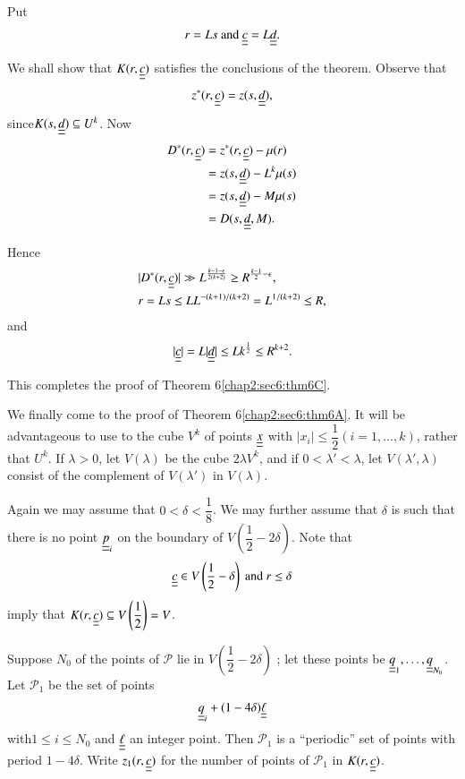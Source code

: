 Put
$$
r = Ls \text{ and } \underline{\underline{c}} = L \underline{\underline{d}}.
$$

We shall show that $K(r, \underline{\underline{c}})$ satisfies the conclusions of the theorem. Observe that
$$
z^{*} (r, \underline{\underline{c}}) = z(s, \underline{\underline{d}}),
$$
since\pageoriginale $K(s, \underline{\underline{d}}) \subseteq U^{k}$. Now
\begin{align*}
D^{*} (r, \underline{\underline{c}}) & = z^{*} (r, \underline{\underline{c}}) - \mu(r)\\
& = z(s, \underline{\underline{d}}) - L^{k} \mu(s)\\
& = z(s, \underline{\underline{d}}) - M\mu(s)\\
& = D(s, \underline{\underline{d}}, M).
\end{align*}

Hence
\begin{align*}
& |D^{*} (r, \underline{\underline{c}})| \gg L^{\frac{k-1-\epsilon}{2(k+2)}} \geq R^{\frac{k-1}{2} - \epsilon},\\
& r = Ls \leq L L^{-(k+1)/(k+2)} = L^{1/(k+2)} \leq R,
\end{align*}
and
\begin{equation*}
|\underline{\underline{c}}| = L|\underline{\underline{d}}| \leq L k^{\frac{1}{2}} \leq R^{k+2}.
\end{equation*}

This completes the proof of Theorem 6\ref{chap2:sec6:thm6C}.

We finally come to the proof of Theorem 6\ref{chap2:sec6:thm6A}. It will be advantageous to use to the cube $V^{k}$ of points $\underline{\underline{x}}$ with $|x_{i}| \leq \dfrac{1}{2} (i = 1, \ldots, k)$, rather that $U^{k}$. If $\lambda > 0$, let $V(\lambda)$ be the cube $2\lambda V^{k}$, and if $0 < \lambda' < \lambda$, let $V(\lambda', \lambda)$ consist of the complement of $V(\lambda')$ in $V(\lambda)$.

Again we may assume that $0 < \delta < \dfrac{1}{8}$. We may further assume that $\delta$ is such that there is no point $\underline{\underline{p}}_{i}$ on the boundary of $V\left(\dfrac{1}{2} - 2\delta\right)$. Note that
$$
\underline{\underline{c}} \in V \left(\frac{1}{2} - \delta\right) \text{ and } r \leq \delta
$$
imply that $K(r, \underline{\underline{c}}) \subseteq V \left(\dfrac{1}{2}\right) = V$.

Suppose $N_{0}$ of the points of $\mathscr{P}$ lie in $V \left(\dfrac{1}{2} - 2\delta\right)$ ; let these points be $\underline{\underline{q}}_{1}, \ldots, \underline{\underline{q}}_{N_{0}}$. Let $\mathscr{P}_{1}$ be the set of points
$$
\underline{\underline{q}}_{i} + (1-4\delta)\underline{\underline{\ell}}
$$
with\pageoriginale $1 \leq i \leq N_{0}$ and $\underline{\underline{\ell}}$ an integer point. Then $\mathscr{P}_{1}$ is a ``periodic'' set of points with period $1-4\delta$. Write $z_{1}(r, \underline{\underline{c}})$ for the number of points of $\mathscr{P}_{1}$ in $K(r, \underline{\underline{c}})$.

